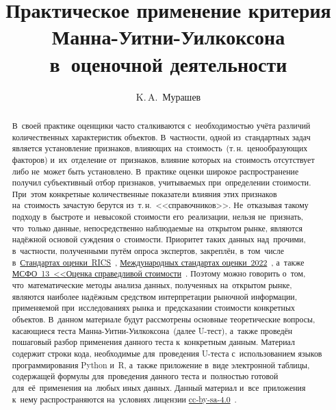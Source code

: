 \documentclass[]{scrartcl}
\title{Практическое применение критерия Манна-Уитни-Уилкоксона в~оценочной деятельности}
\author{K.\,A.~{Мурашев}}
\begin{document}
\maketitle
	
\begin{abstract}
	В~своей практике оценщики часто сталкиваются с~необходимостью учёта различий количественных характеристик объектов. В~частности, одной из~стандартных задач является установление признаков, влияющих на~стоимость~(т.\,н.~ценообразующих факторов) и~их~отделение от~признаков, влияние которых на~стоимость отсутствует либо не~может быть установлено. В~практике оценки широкое распространение получил субъективный отбор признаков, учитываемых при~определении стоимости. При~этом конкретные количественные показатели влияния этих признаков на~стоимость зачастую берутся из~т.\,н.~<<справочников>>. Не~отказывая такому подходу в~быстроте и~невысокой стоимости его~реализации, нельзя не~признать, что~только данные, непосредственно наблюдаемые на~открытом рынке, являются надёжной основой суждения о~стоимости. Приоритет таких данных над~прочими, в~частности, полученными путём опроса экспертов, закреплён, в~том~числе в~\href{https://www.rics.org/uk/upholding-professional-standards/sector-standards/valuation/red-book/red-book-global/}{Стандартах оценки~RICS}~\cite{RVGS-2022}, \href{https://www.rics.org/uk/upholding-professional-standards/sector-standards/valuation/red-book/international-valuation-standards/}{Международных стандартах оценки~2022}~\cite{IVS-2022}, а~также \href{https://normativ.kontur.ru/document?moduleId=1&documentId=326168#l0}{МСФО~13~<<Оценка справедливой стоимости}~\cite{MSFO-13}. Поэтому можно говорить о~том, что~математические методы анализа данных, полученных на~открытом рынке, являются наиболее надёжным средством интерпретации рыночной информации, применяемой при~исследованиях рынка и~предсказании стоимости конкретных объектов. В~данном материале будут рассмотрены основные теоретические вопросы, касающиеся теста Манна-Уитни-Уилкоксона~(далее U-тест), а~также проведён пошаговый разбор применения данного теста к~конкретным данным. Материал содержит строки кода, необходимые для~проведения U-теста с~использованием языков программирования Python и~R, а~также приложение в~виде электронной таблицы, содержащей формулы для~проведения данного теста и~полностью готовой для~её~применения на~любых иных данных.
	Данный материал и~все~приложения к~нему распространяются на~условиях лицензии \href{https://creativecommons.org/licenses/by-sa/4.0/}{cc-by-sa-4.0}~\cite{cc-by-sa-4.0}.
\end{abstract}
%
\tableofcontents
%
\end{document}
